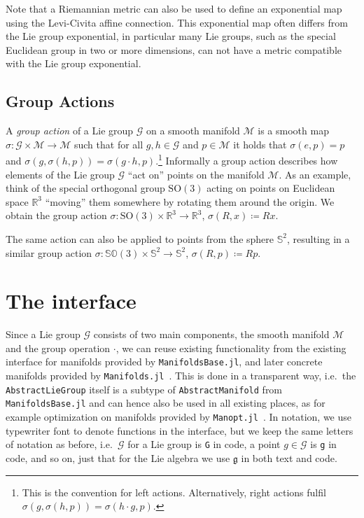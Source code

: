 \documentclass{juliacon}
\newcommand{\term}[1]{\emph{#1}}
\begin{document}
Note that a Riemannian metric can also be used to define an exponential map using the Levi-Civita affine connection.
This exponential map often differs from the Lie group exponential, in particular many Lie groups, such as the special Euclidean group in two or more dimensions, can not have a metric compatible with the Lie group exponential.

\subsection{Group Actions} A \term{group action} of a Lie group \(\mathcal{G}\) on a smooth manifold \(\mathcal{M}\) is a smooth map \(\sigma\colon \mathcal{G} \times \mathcal{M} \to \mathcal{M}\) such that for all \(g, h \in \mathcal{G}\) and \(p \in \mathcal{M}\) it holds that \(\sigma(e, p) = p\) and \(\sigma(g, \sigma(h, p)) = \sigma(g \cdot h, p)\).\footnote{This is the convention for left actions. Alternatively, right actions fulfil \(\sigma(g, \sigma(h, p)) = \sigma(h \cdot g, p)\).}
Informally a group action describes how elements of the Lie group \(\mathcal{G}\) “act on” points on the manifold \(\mathcal{M}\). As an example, think of the special orthogonal group \(\mathrm{SO}(3)\) acting on points on Euclidean space $\mathbb{R}^3$ “moving” them somewhere by rotating them around the origin. We obtain the group action \(\sigma\colon \mathrm{SO}(3) \times \mathbb{R}^3 \to \mathbb{R}^3\), \(\sigma(R, x) \coloneqq Rx\).

The same action can also be applied to points from the sphere \(\mathbb{S}^2\), resulting in a similar group action \(\sigma\colon \mathbb{SO}(3) \times \mathbb{S}^2 \to \mathbb{S}^2\), \(\sigma(R, p) \coloneqq Rp\).

\section{The interface}\label{sec:Interface}

Since a Lie group \(\mathcal{G}\) consists of two main components, the smooth manifold \(\mathcal{M}\) and the group operation \(\cdot\), we can reuse existing functionality from the existing interface for manifolds provided by \verb|ManifoldsBase.jl|, and later concrete manifolds provided by \verb|Manifolds.jl|~\cite{AxenBaranBergmannRzecki:2023}.
This is done in a transparent way, i.e.\ the \verb|AbstractLieGroup| itself is a subtype of \verb|AbstractManifold| from \verb|ManifoldsBase.jl| and can hence also be used in all existing places, as for example optimization on manifolds provided by \verb|Manopt.jl|~\cite{Bergmann:2022}.
In notation, we use typewriter font to denote functions in the interface, but we keep the same letters of notation as before, i.e.\ $\mathcal G$ for a Lie group is \verb|G| in code, a point $g \in \mathcal G$ is \verb|g| in code, and so on, just that for the Lie algebra we use $\mathfrak g$ in both text and code.
\end{document}
